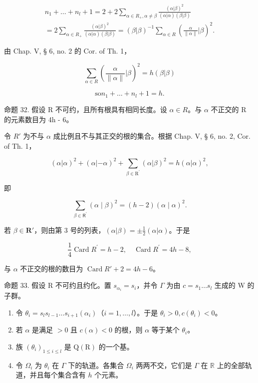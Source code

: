 \[
\begin{array}{l} n _ {1} + \dots + n _ {l} + 1 = 2 + 2 \sum_ {\alpha \in R _ {+}, \alpha \neq \beta} \frac {(\alpha | \beta) ^ {2}}{(\alpha | \alpha) (\beta | \beta)} \\ = 2 \sum_ {\alpha \in R _ {+}} \frac {(\alpha | \beta) ^ {2}}{(\alpha | \alpha) (\beta | \beta)} = (\beta | \beta) ^ {- 1} \sum_ {\alpha \in R} (\frac {\alpha}{\| \alpha \|} | \beta) ^ {2}. \end{array}
\]

由 Chap. V, § 6, no. 2 的 Cor. of Th. 1，

\[
\sum_ {\alpha \in R} \left(\frac {\alpha}{\| \alpha \|} | \beta\right) ^ {2} = h (\beta | \beta)
\]

\[
\mathrm{so} n _ {1} + \dots + n _ {l} + 1 = h.
\]

命题 32. 假设 R 不可约，且所有根具有相同长度。设 \(\alpha \in R\)。与 \(\alpha\) 不正交的 R 的元素数目为 4h - 6。

令 \(R'\) 为不与 \(\alpha\) 成比例且不与其正交的根的集合。根据 Chap. V, § 6, no. 2, Cor. of Th. 1，

\[
(\alpha | \alpha) ^ {2} + (\alpha | - \alpha) ^ {2} + \sum_ {\beta \in \mathrm{R} ^ {\prime}} (\alpha | \beta) ^ {2} = h (\alpha | \alpha) ^ {2},
\]

即

\[
\sum_ {\beta \in \mathsf {R} ^ {\prime}} (\alpha \mid \beta) ^ {2} = (h - 2) (\alpha \mid \alpha) ^ {2}.
\]

若 \(\beta \in \mathbf{R}'\)，则由第 3 号的列表，\((\alpha | \beta) = \pm \frac{1}{2} (\alpha | \alpha)\)。于是

\[
\frac {1}{4} \operatorname{Card} R ^ {\prime} = h - 2, \quad \operatorname{Card} R ^ {\prime} = 4 h - 8,
\]

与 \(\alpha\) 不正交的根的数目为 \(\operatorname{Card} R' + 2 = 4h - 6\)。

命题 33. 假设 R 不可约且约化。置 \(s_{\alpha_i} = s_i\)，并令 \(\Gamma\) 为由 \(c = s_1 \ldots s_l\) 生成的 W 的子群。

\begin{enumerate}
\def\labelenumi{(\roman{enumi})}
\item
  令 \(\theta_{i} = s_{l}s_{l - 1}\dots s_{i + 1}(\alpha_{i})\)（\(i = 1,\dots ,l\)）。于是 \(\theta_{i} > 0,c(\theta_{i}) < 0\)。
\item
  若 \(\alpha\) 是满足 \(>0\) 且 \(c(\alpha) < 0\) 的根，则 \(\alpha\) 等于某个 \(\theta_{i}\)。
\item
  族 \((\theta_{i})_{1\leqslant i\leqslant l}\) 是 \(\mathrm{Q}(\mathrm{R})\) 的一个基。
\item
  令 \(\Omega_{i}\) 为 \(\theta_{i}\) 在 \(\Gamma\) 下的轨道。各集合 \(\Omega_{i}\) 两两不交，它们是 \(\Gamma\) 在 \(\mathbb{R}\) 上的全部轨道，并且每个集合含有 \(h\) 个元素。
\end{enumerate}

